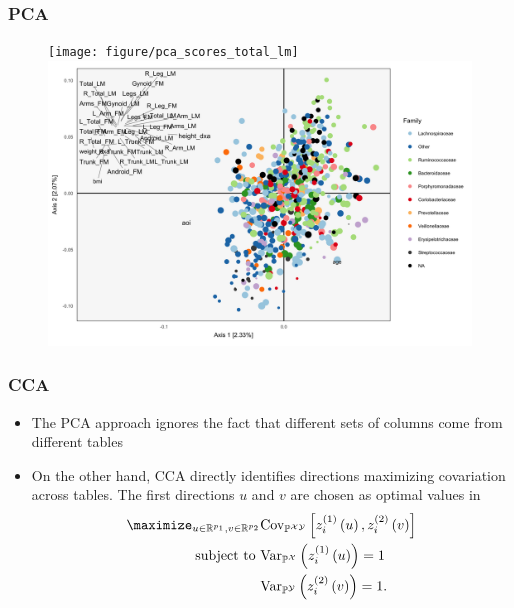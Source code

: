 \documentclass{beamer}
\begin{document}
\begin{frame}
\begin{frame}
\begin{frame}
  \frametitle{PCA}
  \begin{figure}[ht]
    \centering
    \texttt{[image: figure/pca\_scores\_total\_lm]}
    \includegraphics[options]{figure/pca_loadings}
    \caption{\label{fig:pca_scores_total_lm}}
  \end{figure}
\caption{The simplest approach is to combine multiple tables into one and apply a single
  table method. Here we use PCA, treating taxa as rows, so that the usual
  covariance matrix estimator is well defined. \label{fig:pca_multitable}}
\end{frame}

\begin{frame}
  \frametitle{CCA}
\begin{itemize}
\item The PCA approach ignores the fact that different sets of columns come from
  different tables
\item On the other hand, CCA directly identifies directions maximizing
  covariation across tables. The first directions $u$ and $v$ are chosen as
  optimal values in
\begin{align}
  \maximize_{u \in \reals^{p_{1}}, v \in \reals^{p_{2}}}
  &\Covsubarg{\P^{\X\Y}}{z_{i}^{(1)}\left(u\right),
    z_{i}^{(2)}\left(v\right)} \label{eq:cancor_optim} \\
\text{subject to } &\Varsubarg{\P^{\X}}{z_{i}^{(1)}\left(u\right)} = 1 \nonumber \\
&\Varsubarg{\P^{\Y}}{z_{i}^{(2)}\left(v\right)} = 1. \nonumber
\end{align}
\end{itemize}
\end{frame}


\end{frame}
\end{frame}
\end{document}
